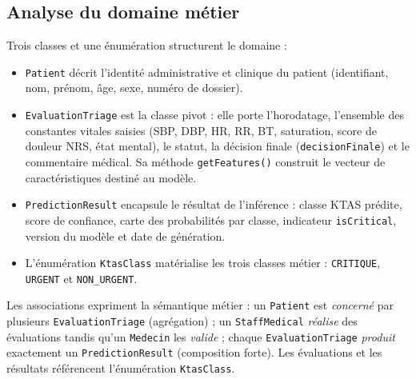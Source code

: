 \subsection{Analyse du domaine métier}
Trois classes et une énumération structurent le domaine :
\begin{itemize}
  \item \texttt{Patient} décrit l'identité administrative et clinique du patient (identifiant,
  nom, prénom, âge, sexe, numéro de dossier).
  \item \texttt{EvaluationTriage} est la classe pivot : elle porte l'horodatage, l'ensemble des
  constantes vitales saisies (SBP, DBP, HR, RR, BT, saturation, score de douleur NRS, état
  mental), le statut, la décision finale (\texttt{decisionFinale}) et le commentaire médical. Sa
  méthode \texttt{getFeatures()} construit le vecteur de caractéristiques destiné au modèle.
  \item \texttt{PredictionResult} encapsule le résultat de l'inférence : classe KTAS prédite,
  score de confiance, carte des probabilités par classe, indicateur \texttt{isCritical}, version
  du modèle et date de génération.
  \item L'énumération \texttt{KtasClass} matérialise les trois classes métier : \texttt{CRITIQUE},
  \texttt{URGENT} et \texttt{NON\_URGENT}.
\end{itemize}
Les associations expriment la sémantique métier : un \texttt{Patient} est \textit{concerné} par
plusieurs \texttt{EvaluationTriage} (agrégation) ; un \texttt{StaffMedical} \textit{réalise} des
évaluations tandis qu'un \texttt{Medecin} les \textit{valide} ; chaque \texttt{EvaluationTriage}
\textit{produit} exactement un \texttt{PredictionResult} (composition forte). Les évaluations et
les résultats référencent l'énumération \texttt{KtasClass}.

